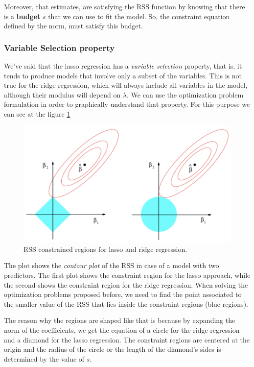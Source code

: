 Moreover, that estimates, are satisfying the RSS function by knowing that there is a \textbf{budget} $s$ that we can use to fit the model. So, the constraint equation defined by the norm, must satisfy this budget.

\subsubsection*{Variable Selection property}
We've said that the lasso regression has a \textit{variable selection} property, that is, it tends to produce models that involve only a subset of the variables. This is not true for the ridge regression, which will always include all variables in the model, although their modulus will depend on $\lambda$.
We can use the optimization problem formulation in order to graphically understand that property. For this purpose we can see at the figure \ref{fig:rssregions}

\begin{figure}
    \centering
    \includegraphics[width=0.8\linewidth]{./figures/chapter_4/rssregions.png}
    \caption{RSS constrained regions for lasso and ridge regression.}
    \label{fig:rssregions}
\end{figure}

The plot shows the \textit{contour plot} of the RSS in case of a model with two predictors.
The first plot shows the constraint region for the lasso approach, while the second shows the constraint region for the ridge regression.
When solving the optimization problems proposed before, we need to find the point associated to the smaller value of the RSS that lies inside the constraint regions (blue regions).

The reason why the regions are shaped like that is because by expanding the norm of the coefficients, we get the equation of a circle for the ridge regression and a diamond for the lasso regression. The constraint regions are centered at the origin and the radius of the circle or the length of the diamond's sides is determined by the value of $s$.

